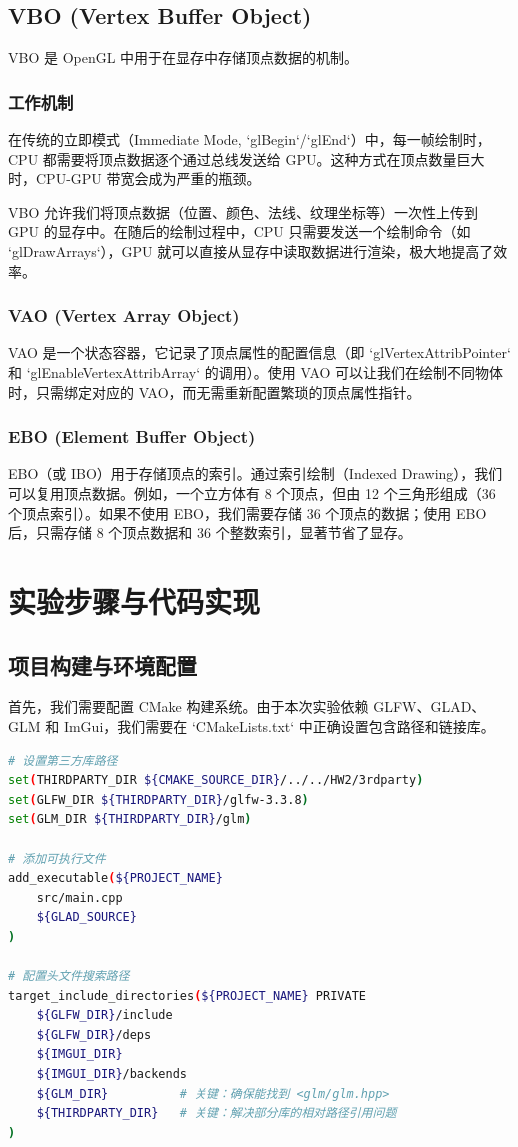 \documentclass[a4paper]{article}
\begin{document}
\subsection{VBO (Vertex Buffer Object)}
VBO 是 OpenGL 中用于在显存中存储顶点数据的机制。

\subsubsection{工作机制}
在传统的立即模式（Immediate Mode, `glBegin`/`glEnd`）中，每一帧绘制时，CPU 都需要将顶点数据逐个通过总线发送给 GPU。这种方式在顶点数量巨大时，CPU-GPU 带宽会成为严重的瓶颈。

VBO 允许我们将顶点数据（位置、颜色、法线、纹理坐标等）一次性上传到 GPU 的显存中。在随后的绘制过程中，CPU 只需要发送一个绘制命令（如 `glDrawArrays`），GPU 就可以直接从显存中读取数据进行渲染，极大地提高了效率。

\subsubsection{VAO (Vertex Array Object)}
VAO 是一个状态容器，它记录了顶点属性的配置信息（即 `glVertexAttribPointer` 和 `glEnableVertexAttribArray` 的调用）。使用 VAO 可以让我们在绘制不同物体时，只需绑定对应的 VAO，而无需重新配置繁琐的顶点属性指针。

\subsubsection{EBO (Element Buffer Object)}
EBO（或 IBO）用于存储顶点的索引。通过索引绘制（Indexed Drawing），我们可以复用顶点数据。例如，一个立方体有 8 个顶点，但由 12 个三角形组成（36 个顶点索引）。如果不使用 EBO，我们需要存储 36 个顶点的数据；使用 EBO 后，只需存储 8 个顶点数据和 36 个整数索引，显著节省了显存。

\newpage

\section{实验步骤与代码实现}

\subsection{项目构建与环境配置}
首先，我们需要配置 CMake 构建系统。由于本次实验依赖 GLFW、GLAD、GLM 和 ImGui，我们需要在 `CMakeLists.txt` 中正确设置包含路径和链接库。

\begin{lstlisting}[language=bash, caption={CMakeLists.txt 关键配置}]
# 设置第三方库路径
set(THIRDPARTY_DIR ${CMAKE_SOURCE_DIR}/../../HW2/3rdparty)
set(GLFW_DIR ${THIRDPARTY_DIR}/glfw-3.3.8)
set(GLM_DIR ${THIRDPARTY_DIR}/glm)

# 添加可执行文件
add_executable(${PROJECT_NAME}
    src/main.cpp
    ${GLAD_SOURCE}
)

# 配置头文件搜索路径
target_include_directories(${PROJECT_NAME} PRIVATE
    ${GLFW_DIR}/include
    ${GLFW_DIR}/deps
    ${IMGUI_DIR}
    ${IMGUI_DIR}/backends
    ${GLM_DIR}          # 关键：确保能找到 <glm/glm.hpp>
    ${THIRDPARTY_DIR}   # 关键：解决部分库的相对路径引用问题
)
\end{lstlisting}
\end{document}
